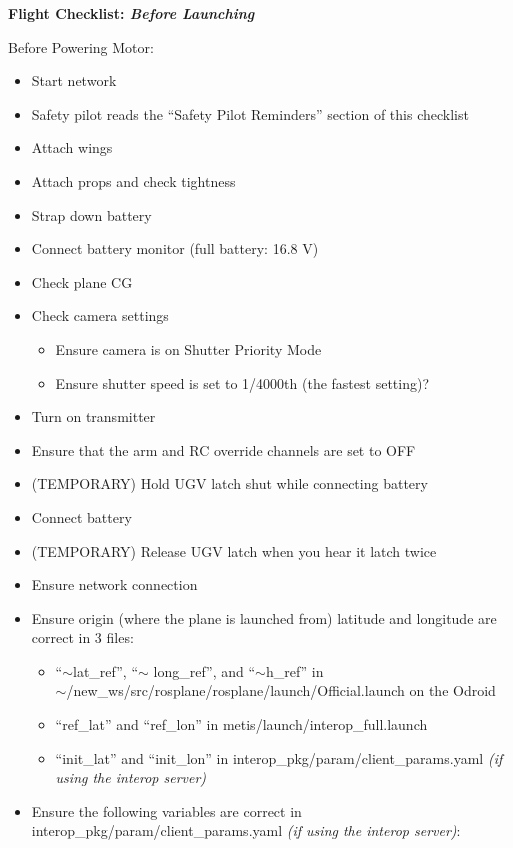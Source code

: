 \documentclass[]{auvsi_doc}
\begin{document}
\textbf{Flight Checklist: \textit{Before Launching}}

Before Powering Motor:

\begin{itemize}
	\item Start network
	\item Safety pilot reads the ``Safety Pilot Reminders'' section of this checklist
	\item Attach wings%
	\item Attach props and check tightness
	\item Strap down battery
	\item Connect battery monitor (full battery: 16.8 V)
	\item Check plane CG
        \item Check camera settings
        \begin{itemize}
          \item Ensure camera is on Shutter Priority Mode
          \item Ensure shutter speed is set to 1/4000th (the fastest setting)?
        \end{itemize}
	\item Turn on transmitter
	\item Ensure that the arm and RC override channels are set to OFF
	\item (TEMPORARY) Hold UGV latch shut while connecting battery
	\item Connect battery
	\item (TEMPORARY) Release UGV latch when you hear it latch twice
	\item Ensure network connection
	\item Ensure origin (where the plane is launched from) latitude and longitude are correct in 3 files:
	\begin{itemize}
		\item ``$\sim$lat\_ref'', ``$\sim$ long\_ref'', and ``$\sim$h\_ref'' in \\ $\sim$/new\_ws/src/rosplane/rosplane/launch/Official.launch on the Odroid
		\item ``ref\_lat'' and ``ref\_lon'' in metis/launch/interop\_full.launch
		\item ``init\_lat'' and ``init\_lon'' in interop\_pkg/param/client\_params.yaml \textit{(if using the interop server)}
	\end{itemize}
	\item Ensure the following variables are correct in interop\_pkg/param/client\_params.yaml \textit{(if using the interop server)}:

\end{itemize}
\end{document}
